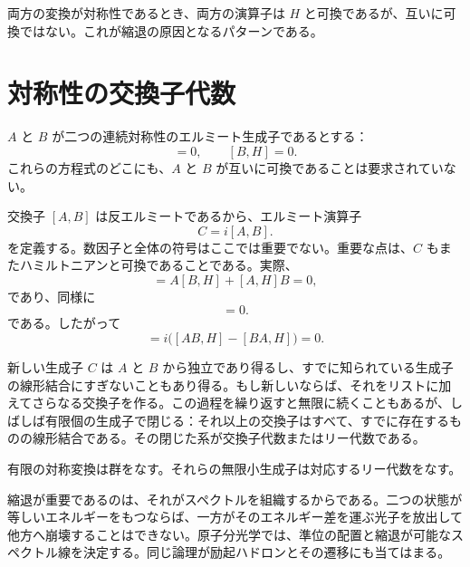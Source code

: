 両方の変換が対称性であるとき、両方の演算子は \(H\) と可換であるが、互いに可換ではない。これが縮退の原因となるパターンである。

\begin{classroomqa}
\end{classroomqa}

\section{対称性の交換子代数}

\(A\) と \(B\) が二つの連続対称性のエルミート生成子であるとする：
\begin{equation}
[A,H]=0,
\qquad
[B,H]=0.
\end{equation}
これらの方程式のどこにも、\(A\) と \(B\) が互いに可換であることは要求されていない。

交換子 \([A,B]\) は反エルミートであるから、エルミート演算子
\begin{equation}
C=i[A,B].
\end{equation}
を定義する。数因子と全体の符号はここでは重要でない。重要な点は、\(C\) もまたハミルトニアンと可換であることである。実際、
\begin{equation}
[AB,H]
=A[B,H]+[A,H]B=0,
\end{equation}
であり、同様に
\begin{equation}
[BA,H]=0.
\end{equation}
である。したがって
\begin{equation}
[C,H]
=i\bigl([AB,H]-[BA,H]\bigr)=0.
\end{equation}

新しい生成子 \(C\) は \(A\) と \(B\) から独立であり得るし、すでに知られている生成子の線形結合にすぎないこともあり得る。もし新しいならば、それをリストに加えてさらなる交換子を作る。この過程を繰り返すと無限に続くこともあるが、しばしば有限個の生成子で閉じる：それ以上の交換子はすべて、すでに存在するものの線形結合である。その閉じた系が交換子代数またはリー代数である。

有限の対称変換は群をなす。それらの無限小生成子は対応するリー代数をなす。

縮退が重要であるのは、それがスペクトルを組織するからである。二つの状態が等しいエネルギーをもつならば、一方がそのエネルギー差を運ぶ光子を放出して他方へ崩壊することはできない。原子分光学では、準位の配置と縮退が可能なスペクトル線を決定する。同じ論理が励起ハドロンとその遷移にも当てはまる。

